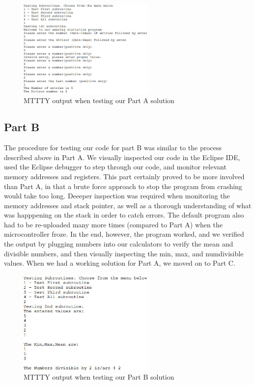 \documentclass[letterpaper]{article}
\begin{document}
    \begin{figure}[H]
      \centering
      \includegraphics[width=0.6\textwidth]{parta.jpg}
      \caption{MTTTY output when testing our Part A solution}
    \end{figure}

  \subsection{Part B}
    The procedure for testing our code for part B was similar to the process
    described above in Part A. We visually inspected our code in the Eclipse IDE,
    used the Eclipse debugger to step through our code, and monitor relevant
    memory addresses and registers. This part certainly proved to
    be more involved than Part A, in that a brute force approach to
    stop the program from crashing would take too long. Deeeper inspection
    was required when monitoring the memory addresses and stack pointer, as
    well as a thorough understanding of what was happpening on the stack
    in order to catch errors. The default program also had to
    be re-uploaded many more times (compared to Part A) when the microcontroller froze.
    In the end, however, the program worked, and we verified the output
    by plugging numbers into our calculators to verify the mean and divisible numbers,
    and then visually inspecting the min, max, and numdivisible values.
    When we had a working solution for Part A, we moved on to Part C.

    \begin{figure}[H]
      \centering
      \includegraphics[width=0.6\textwidth]{partb.jpg}
      \caption{MTTTY output when testing our Part B solution}
    \end{figure}
\end{document}
